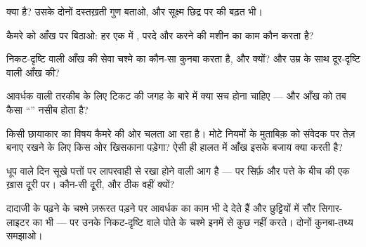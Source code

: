 \begin{exercise}[$\star$]\label{exo:g8:lenses-images:5}
 क्या है? उसके दोनों दस्तख़ती गुण बताओ, और सूक्ष्म
छिद्र पर  की बढ़त भी।
\end{exercise}

\begin{exercise}[$\star$]\label{exo:g8:lenses-images:6}
कैमरे को आँख पर बिठाओ: हर एक में , परदे और  करने की मशीन का
काम कौन करता है?
\end{exercise}

\begin{exercise}[$\star$]\label{exo:g8:lenses-images:7}
निकट-दृष्टि वाली आँख की सेवा चश्मे का कौन-सा कुनबा करता है, और क्यों?
और उम्र के साथ दूर-दृष्टि वाली आँख की?
\end{exercise}

\begin{exercise}[$\star$]\label{exo:g8:lenses-images:8}
आवर्धक वाली तरकीब के लिए टिकट की जगह के बारे में क्या सच होना चाहिए ---
और आँख को तब कैसा ``'' नसीब होता है?
\end{exercise}

\begin{exercise}[$\star\star$]\label{exo:g8:lenses-images:9}
किसी छायाकार का विषय कैमरे की ओर चलता आ रहा है। मोटे नियमों के मुताबिक़
 को संवेदक पर तेज़ बनाए रखने के लिए  किस ओर खिसकाना
पड़ेगा? ऐसी ही हालत में आँख इसके बजाय क्या करती है?
\end{exercise}

\begin{exercise}[$\star\star$]\label{exo:g8:lenses-images:10}
धूप वाले दिन सूखे पत्तों पर लापरवाही से रखा  होने वाली आग है ---
पर सिर्फ़  और पत्ते के बीच की एक ख़ास दूरी पर। कौन-सी दूरी, और
ठीक वहीं क्यों?
\end{exercise}

\begin{exercise}[$\star\star$]\label{exo:g8:lenses-images:11}
दादाजी के पढ़ने के चश्मे ज़रूरत पड़ने पर आवर्धक का काम भी दे देते हैं
और छुट्टियों में सौर सिगार-लाइटर का भी --- पर उनके निकट-दृष्टि वाले
पोते के चश्मे इनमें से कुछ नहीं करते। दोनों कुनबा-तथ्य समझाओ।
\end{exercise}

